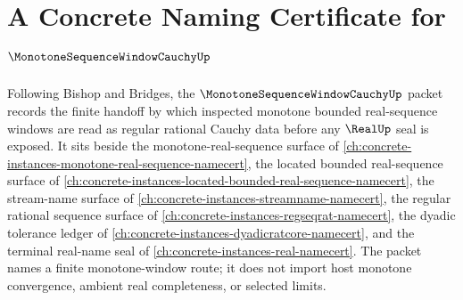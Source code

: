 \chapter{A Concrete Naming Certificate for $\MonotoneSequenceWindowCauchyUp$}
\label{ch:concrete-instances-monotone-sequence-window-cauchy-namecert}

Following Bishop and Bridges, the $\MonotoneSequenceWindowCauchyUp$ packet records the finite handoff by which inspected monotone bounded real-sequence windows are read as regular rational Cauchy data before any $\RealUp$ seal is exposed. It sits beside the monotone-real-sequence surface of \autoref{ch:concrete-instances-monotone-real-sequence-namecert}, the located bounded real-sequence surface of \autoref{ch:concrete-instances-located-bounded-real-sequence-namecert}, the stream-name surface of \autoref{ch:concrete-instances-streamname-namecert}, the regular rational sequence surface of \autoref{ch:concrete-instances-regseqrat-namecert}, the dyadic tolerance ledger of \autoref{ch:concrete-instances-dyadicratcore-namecert}, and the terminal real-name seal of \autoref{ch:concrete-instances-real-namecert}. The packet names a finite monotone-window route; it does not import host monotone convergence, ambient real completeness, or selected limits.

